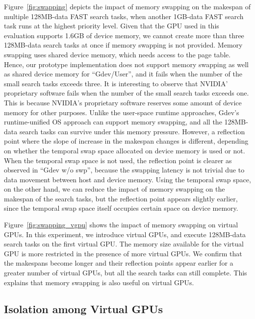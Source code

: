 Figure~\ref{fig:swapping} depicts the impact of memory swapping on the
makespan of multiple 128MB-data FAST search tasks, when another 1GB-data
FAST search task runs at the highest priority level. 
Given that the GPU used in this evaluation supports 1.6GB of device
memory, we cannot create more than three 128MB-data search tasks at once
if memory swapping is not provided.
Memory swapping uses shared device memory, which needs access to the
page table.
Hence, our prototype implementation does not support memory swapping as
well as shared device memory for ``Gdev/User'', and it fails when
the number of the small search tasks exceeds three.
It is interesting to observe that NVIDIA' proprietary software fails
when the number of the small search tasks exceeds one.
This is because NVIDIA's proprietary software reserves some
amount of device memory for other purposes.
Unlike the user-space runtime approaches, Gdev's runtime-unified OS
approach can support memory swapping, and all the 128MB-data search
tasks can survive under this memory pressure.
However, a reflection point where the slope of increase in the makespan
changes is different, depending on whether the temporal swap
space allocated on device memory is used or not.
When the temporal swap space is not used, the reflection point is
clearer as observed in ``Gdev w/o swp'', because the swapping latency is
not trivial due to data movement between host and device memory.
Using the temporal swap space, on the other hand, we can reduce the impact
of memory swapping on the makespan of the search tasks, but the
reflection point appears slightly earlier, since the temporal swap space
itself occupies certain space on device memory.

Figure~\ref{fig:swapping_vgpu} shows the impact of memory swapping on
virtual GPUs.
In this experiment, we introduce virtual GPUs, and execute 128MB-data
search tasks on the first virtual GPU.
The memory size available for the virtual GPU is more restricted in
the presence of more virtual GPUs.
We confirm that the makespans become longer and their reflection points
appear earlier for a greater number of virtual GPUs, but all the search
tasks can still complete.
This explains that memory swapping is also useful on virtual GPUs.

\vspace{-0.25em}
\subsection{Isolation among Virtual GPUs}
\vspace{-0.25em}

